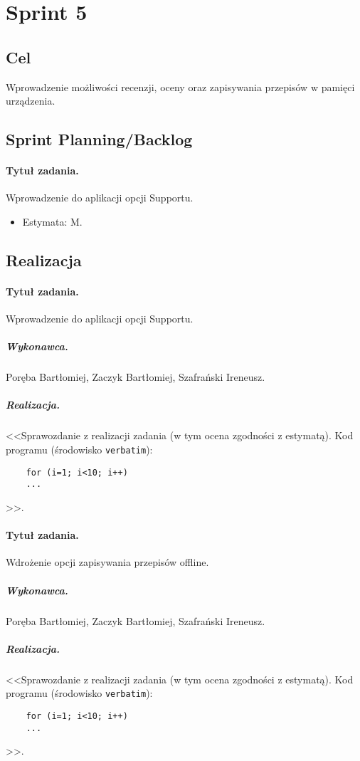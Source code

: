 \documentclass[a4paper]{article}
\begin{document}
	
	\section{Sprint 5}
	
	\subsection{Cel} Wprowadzenie możliwości recenzji, oceny oraz zapisywania przepisów w pamięci urządzenia.
	
	\subsection{Sprint Planning/Backlog}
	
	\paragraph{Tytuł zadania.} Wprowadzenie do aplikacji opcji Supportu.
	\begin{itemize}
		\item Estymata: M.
	\end{itemize}
	
	
	\subsection{Realizacja}
	
	\paragraph{Tytuł zadania.} Wprowadzenie do aplikacji opcji Supportu.
	\subparagraph{Wykonawca.} Poręba Bartłomiej, Zaczyk Bartłomiej, Szafrański Ireneusz.
	\subparagraph{Realizacja.} <<Sprawozdanie z realizacji zadania (w tym ocena zgodności z estymatą). Kod programu (środowisko \texttt{verbatim}): \begin{verbatim}
	for (i=1; i<10; i++)
	...
	\end{verbatim}>>.
	
	\paragraph{Tytuł zadania.} Wdrożenie opcji zapisywania przepisów offline.
	\subparagraph{Wykonawca.} Poręba Bartłomiej, Zaczyk Bartłomiej, Szafrański Ireneusz.
	\subparagraph{Realizacja.} <<Sprawozdanie z realizacji zadania (w tym ocena zgodności z estymatą). Kod programu (środowisko \texttt{verbatim}): \begin{verbatim}
	for (i=1; i<10; i++)
	...
	\end{verbatim}>>.
	
\end{document}
